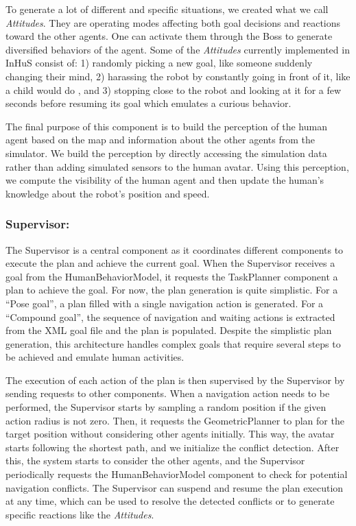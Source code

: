 To generate a lot of different and specific situations, we created what we call \textit{Attitudes}. They are operating modes affecting both goal decisions and reactions toward the other agents. One can activate them through the Boss to generate diversified behaviors of the agent. Some of the \textit{Attitudes} currently implemented in InHuS consist of: 1) randomly picking a new goal, like someone suddenly changing their mind, 2) harassing the robot by constantly going in front of it, like a child would do \cite{nomura2016children}, and 3) stopping close to the robot and looking at it for a few seconds before resuming its goal which emulates a curious behavior. 

The final purpose of this component is to build the perception of the human agent based on the map and information about the other agents from the simulator. We build the perception by directly accessing the simulation data rather than adding simulated sensors to the human avatar. Using this perception, we compute the visibility of the human agent and then update the human's knowledge about the robot's position and speed.

\subsubsection{Supervisor:}
The Supervisor is a central component as it coordinates different components to execute the plan and achieve the current goal. When the Supervisor receives a goal from the HumanBehaviorModel, it requests the TaskPlanner component a plan to achieve the goal. For now, the plan generation is quite simplistic. For a ``Pose goal'', a plan filled with a single navigation action is generated. For a ``Compound goal'', the sequence of navigation and waiting actions is extracted from the XML goal file and the plan is populated. Despite the simplistic plan generation, this architecture handles complex goals that require several steps to be achieved and emulate human activities.  

The execution of each action of the plan is then supervised by the Supervisor by sending requests to other components. 
When a navigation action needs to be performed, the Supervisor starts by sampling a random position if the given action radius is not zero. Then, it requests the GeometricPlanner to plan for the target position without considering other agents initially. This way, the avatar starts following the shortest path, and we initialize the conflict detection. After this, the system starts to consider the other agents, and the Supervisor periodically requests the HumanBehaviorModel component to check for potential navigation conflicts. The Supervisor can suspend and resume the plan execution at any time, which can be used to resolve the detected conflicts or to generate specific reactions like the \textit{Attitudes}.

